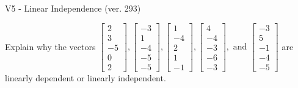 \begin{exercise}
  \begin{exerciseTitle}V5 - Linear Independence (ver. 293)\end{exerciseTitle}
  \begin{exerciseStatement}
    Explain why the vectors \(\left[\begin{array}{r}
2 \\
3 \\
-5 \\
0 \\
2
\end{array}\right] , \left[\begin{array}{r}
-3 \\
1 \\
-4 \\
-5 \\
-5
\end{array}\right] , \left[\begin{array}{r}
1 \\
-4 \\
2 \\
1 \\
-1
\end{array}\right] , \left[\begin{array}{r}
4 \\
-4 \\
-3 \\
-6 \\
-3
\end{array}\right] , \text{ and } \left[\begin{array}{r}
-3 \\
5 \\
-1 \\
-4 \\
-5
\end{array}\right]\) are linearly dependent or linearly independent.	



\end{exerciseStatement}
\end{exercise}
